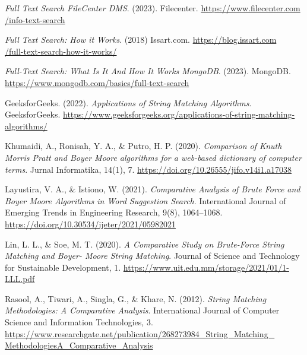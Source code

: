 \begin{thebibliography}{20}
    \emph{Full Text Search \textbar{} FileCenter DMS}. (2023). Filecenter. 
    \href{https://www.filecenter.com/info-text-search.html#:~:text=In\%20a\%20nutshell\%2C\%20full\%20text,merely\%20searching\%20the\%20file\%20nameS}{https://www.filecenter.com\\/info-text-search}

    \emph{Full Text Search: How it Works}. (2018) Issart.com.
    \href{https://blog.issart.com/full-text-search-how-it-works/}{https://blog.issart.com\\/full-text-search-how-it-works/}

    \emph{Full-Text Search: What Is It And How It Works \textbar{} MongoDB}. (2023). MongoDB.
    \href{https://www.mongodb.com/basics/full-text-search}{https://www.mongodb.com/basics/full-text-search}

    GeeksforGeeks. (2022). \emph{Applications of String Matching Algorithms}. GeeksforGeeks.
    \href{https://www.geeksforgeeks.org/applications-of-string-matching-algorithms/}{https://www.geeksforgeeks.org/applications-of-string-matching-algorithms/}

    Khumaidi, A., Ronisah, Y. A., \& Putro, H. P. (2020). \emph{Comparison of Knuth Morris Pratt and
    Boyer Moore algorithms for a web-based dictionary of computer terms}. Jurnal Informatika, 14(1), 7. 
    \href{https://doi.org/10.26555/jifo.v14i1.a17038}{https://doi.org/10.26555/jifo.v14i1.a17038}

    Layustira, V. A., \& Istiono, W. (2021). \emph{Comparative Analysis of Brute Force and Boyer
    Moore Algorithms in Word Suggestion Search}. International Journal of Emerging Trends in
    Engineering Research, 9(8), 1064–1068. 
    \href{https://doi.org/10.30534/ijeter/2021/05982021}{https://doi.org/10.30534/ijeter/2021/05982021}

    Lin, L. L., \& Soe, M. T. (2020). \emph{A Comparative Study on Brute-Force String Matching and
    Boyer- Moore String Matching}. Journal of Science and Technology for Sustainable Development, 1.
    \href{https://www.uit.edu.mm/storage/2021/01/1-LLL.pdf}{https://www.uit.edu.mm/storage/2021/01/1-LLL.pdf}

    Rasool, A., Tiwari, A., Singla, G., \& Khare, N. (2012). \emph{String Matching Methodologies: A
    Comparative Analysis}. International Journal of Computer Science and Information Technologies, 3. 
    \href{https://www.researchgate.net/publication/268273984_String_Matching_MethodologiesA_Comparative_Analysis}{https://www.researchgate.net/publication/268273984\_String\_Matching\_\\MethodologiesA\_Comparative\_Analysis}


\end{thebibliography}
